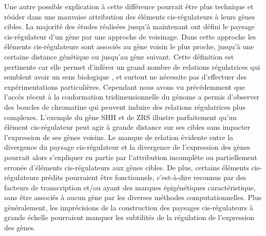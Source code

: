 Une autre possible explication à cette différence pourrait être plus technique et résider dans une mauvaise attribution des éléments \gls{cis}-régulateurs à leurs gènes cibles. La majorité des études réalisées jusqu’à maintenant ont défini le paysage \gls{cis}-régulateur d’un gène par une approche de voisinage. Dans cette approche les éléments \gls{cis}-régulateurs sont associés au gène voisin le plus proche, jusqu’à une certaine distance génétique ou jusqu’au gène suivant. Cette définition est pertinente car elle permet d’inférer un grand nombre de relations régulatrices qui semblent avoir un sens biologique \citep{kundaje_integrative_2015}, et surtout ne nécessite pas d’effectuer des expérimentations particulières. Cependant nous avons vu précédemment que l’accès récent à la conformation tridimensionnelle du génome a permis d’observer des boucles de chromatine qui peuvent induire des relations régulatrices plus complexes. L’exemple du gène \acrshort{SHH} et de \acrshort{ZRS} illustre parfaitement qu’un élément \gls{cis}-régulateur peut agir à grande distance sur ses cibles sans impacter l’expression de ses gènes voisins. Le manque de relation évidente entre la divergence du paysage \gls{cis}-régulateur et la divergence de l’expression des gènes pourrait alors s’expliquer en partie par l’attribution incomplète ou partiellement erronée d’éléments \gls{cis}-régulateurs aux gènes cibles. De plus, certains éléments \gls{cis}-régulateurs prédits pourraient être fonctionnels, c’est-à-dire reconnus par des facteurs de transcription et/ou ayant des marques épigénétiques caractéristique, sans être associés à aucun gène par les diverses méthodes computationnelles. Plus généralement, les imprécisions de la construction des paysages \gls{cis}-régulateurs à grande échelle pourraient manquer les subtilités de la régulation de l’expression des gènes. \\
